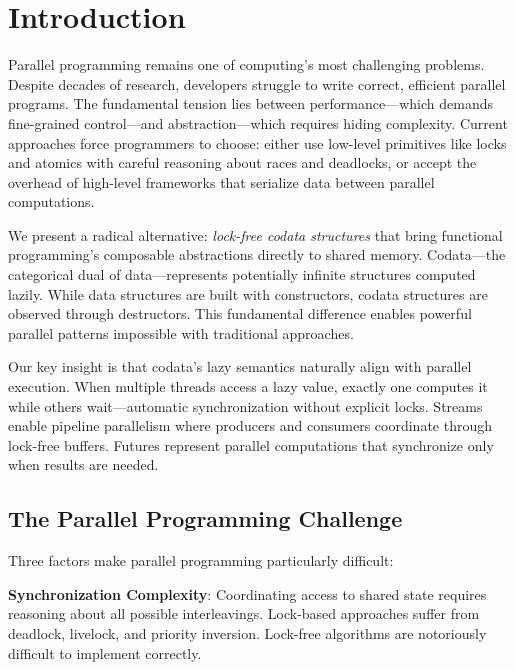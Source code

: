\documentclass[sigconf,review,anonymous]{acmart}
\begin{document}
\maketitle

\section{Introduction}

Parallel programming remains one of computing's most challenging problems. Despite decades of research, developers struggle to write correct, efficient parallel programs. The fundamental tension lies between performance---which demands fine-grained control---and abstraction---which requires hiding complexity. Current approaches force programmers to choose: either use low-level primitives like locks and atomics with careful reasoning about races and deadlocks, or accept the overhead of high-level frameworks that serialize data between parallel computations.

We present a radical alternative: \emph{lock-free codata structures} that bring functional programming's composable abstractions directly to shared memory. Codata---the categorical dual of data---represents potentially infinite structures computed lazily. While data structures are built with constructors, codata structures are observed through destructors. This fundamental difference enables powerful parallel patterns impossible with traditional approaches.

Our key insight is that codata's lazy semantics naturally align with parallel execution. When multiple threads access a lazy value, exactly one computes it while others wait---automatic synchronization without explicit locks. Streams enable pipeline parallelism where producers and consumers coordinate through lock-free buffers. Futures represent parallel computations that synchronize only when results are needed.

\subsection{The Parallel Programming Challenge}

Three factors make parallel programming particularly difficult:

\textbf{Synchronization Complexity}: Coordinating access to shared state requires reasoning about all possible interleavings. Lock-based approaches suffer from deadlock, livelock, and priority inversion. Lock-free algorithms are notoriously difficult to implement correctly.
\end{document}
